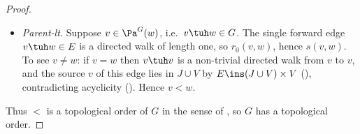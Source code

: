 \documentclass[main]{subfiles}
\begin{document}
\begin{proof}
\begin{itemize}
\item \emph{Parent-lt.} Suppose $v \in \Pa^G(w)$, i.e.\ $v \tuh w \in G$. The single forward edge $v \tuh w \in E$ is a directed walk of length one, so $r_0(v, w)$, hence $s(v, w)$. To see $v \neq w$: if $v = w$ then $v \tuh v$ is a non-trivial directed walk from $v$ to $v$, and the source $v$ of this edge lies in $J \cup V$ by $E \ins (J \cup V) \times V$ (), contradicting acyclicity (). Hence $v < w$.
\end{itemize}

Thus $<$ is a topological order of $G$ in the sense of ,
so $G$ has a topological order.
\end{proof}
\end{document}
